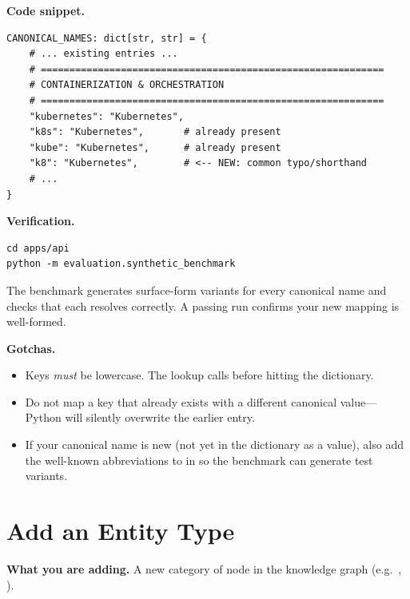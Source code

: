 \medskip\noindent\textbf{Code snippet.}

\begin{lstlisting}[style=python, title=Adding a Kubernetes alias]
CANONICAL_NAMES: dict[str, str] = {
    # ... existing entries ...
    # ============================================================
    # CONTAINERIZATION & ORCHESTRATION
    # ============================================================
    "kubernetes": "Kubernetes",
    "k8s": "Kubernetes",       # already present
    "kube": "Kubernetes",      # already present
    "k8": "Kubernetes",        # <-- NEW: common typo/shorthand
    # ...
}
\end{lstlisting}

\medskip\noindent\textbf{Verification.}

\begin{lstlisting}[style=bash, numbers=none]
cd apps/api
python -m evaluation.synthetic_benchmark
\end{lstlisting}

The benchmark generates surface-form variants for every canonical name and
checks that each resolves correctly.  A passing run confirms your new
mapping is well-formed.

\medskip\noindent\textbf{Gotchas.}

\begin{itemize}
    \item Keys \emph{must} be lowercase.  The lookup calls
           before hitting the dictionary.
    \item Do not map a key that already exists with a different canonical
          value---Python will silently overwrite the earlier entry.
    \item If your canonical name is new (not yet in the dictionary as a
          value), also add the well-known abbreviations to
           in
           so the benchmark
          can generate test variants.
\end{itemize}


\section{Add an Entity Type}
\label{sec:add-entity-type}

\noindent\textbf{What you are adding.}
A new category of node in the knowledge graph (e.g.\ ,
).


